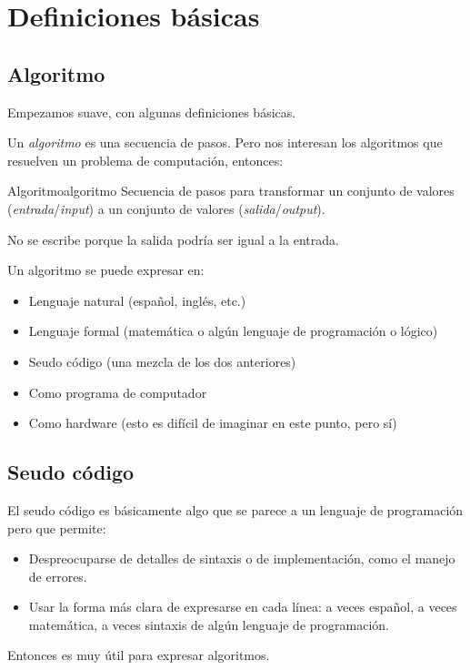 \section{Definiciones básicas}

\subsection{Algoritmo}

Empezamos suave, con algunas definiciones básicas.

Un \emph{algoritmo} es una secuencia de pasos. Pero nos interesan los algoritmos que resuelven un problema de computación, entonces:

\begin{definicion}{Algoritmo}{algoritmo}
Secuencia de pasos para transformar un conjunto de valores (\emph{entrada}/\emph{\textit{input}}) a un conjunto de valores (\emph{salida}/\emph{\textit{output}}).
\end{definicion}
No se escribe  porque la salida podría ser igual a la entrada.

Un algoritmo se puede expresar en:
\begin{itemize}
  \item Lenguaje natural (español, inglés, etc.)
  \item Lenguaje formal (matemática o algún lenguaje de programación o lógico)
  \item Seudo código (una mezcla de los dos anteriores)
  \item Como programa de computador
  \item Como hardware (esto es difícil de imaginar en este punto, pero sí)
\end{itemize}

\subsection{Seudo código}

El seudo código es básicamente algo que se parece a un lenguaje de programación pero que permite:
\begin{itemize}
  \item Despreocuparse de detalles de sintaxis o de implementación, como el manejo de errores.
  \item Usar la forma más clara de expresarse en cada línea: a veces español, a veces matemática, a veces sintaxis de algún lenguaje de programación.
\end{itemize}
Entonces es muy útil para expresar algoritmos.

